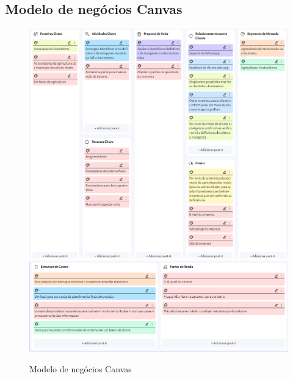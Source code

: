 
\begin{Appendix}

    \section{Modelo de negócios Canvas}%
    \label{sect:apx-a1}
    
    \begin{figure}[H]
    \centering
    \caption{Modelo de negócios Canvas}%
    \label{fig:canvaspi}
    \includegraphics[width=0.8\linewidth]{Illustrations/canvaspi1.png}
    \includegraphics[width=0.8\linewidth]{Illustrations/canvaspi2.png}
    \end{figure}
    
\end{Appendix}
    
    
\printindex%
    